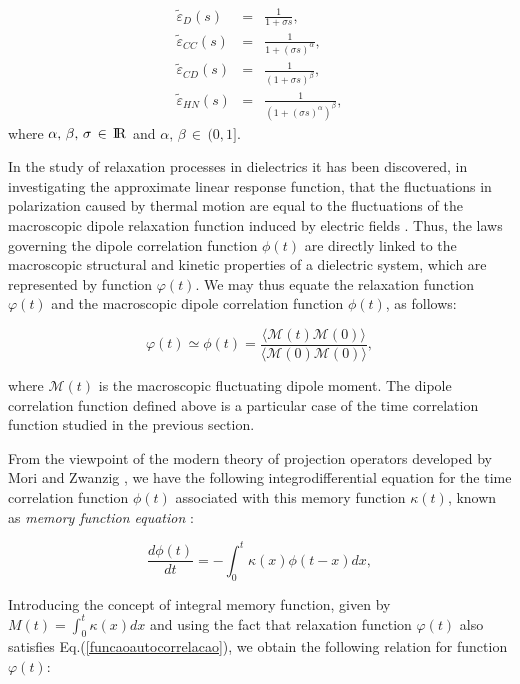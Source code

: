 \documentclass[12pt]{amsart}
\numberwithin{equation}{section}
\newcommand{\real}{{\rm I\!R}}
\begin{document}
\begin{eqnarray}
\tilde{\varepsilon}_{D}(s)&=&\frac{1}{1+\sigma
s},\label{debye}\\
\tilde{\varepsilon}_{CC}(s)&=&\frac{1}{1+(\sigma
s)^\alpha},\label{coco}\\
\tilde{\varepsilon}_{CD}(s)&=&\frac{1}{(1+\sigma
s)^\beta},\label{coda}\\
\tilde{\varepsilon}_{HN}(s)&=&\frac{1}{(1+(\sigma
s)^\alpha)^\beta}\label{hn},
\end{eqnarray}
where $\alpha,\,\beta,\,\sigma\,\in\,\real$ and $\alpha,\,\beta\,\in\,\mbox{(}0,1\mbox{]}$.

In the study of relaxation processes in dielectrics it has been discovered, in
investigating the approximate linear response function, that the fluctuations
in polarization caused by thermal motion are equal to the fluctuations of the
macroscopic dipole relaxation function induced by electric fields
\cite{Williams:1972}. Thus, the laws governing the dipole
correlation function $\phi(t)$ are directly linked to the macroscopic
structural and kinetic properties of a dielectric system, which are represented
by function $\varphi (t)$. We may thus equate the relaxation function
$\varphi(t)$ and the macroscopic dipole correlation function $\phi(t)$, as
follows:
		
\begin{equation}
\varphi(t)\simeq\phi(t)=\frac{\langle
\mathcal{M}(t)\mathcal{M}(0)\rangle}{\langle \mathcal{M}(0)\mathcal{M}(0)\rangle},
\end{equation}
		
where $\mathcal{M}(t)$ is the macroscopic fluctuating dipole moment.
The dipole correlation function defined above is a particular case of the time
correlation function studied in the previous section. 
		
From the viewpoint of the modern theory of projection operators developed
by 
Mori \cite{Mori:1965} and Zwanzig \cite{Zwanzig:1961}, we have the
following integrodifferential equation for the time correlation function 
$\phi(t)$ associated with this memory function $\kappa(t)$,
known as \textit{memory function equation} \cite{Boon:1980}:
		
\begin{equation}
\frac{d\phi(t)}{dt}=-\int_{0}^{t}\kappa(x)\phi(t-x)dx,
\label{funcaoautocorrelacao}
\end{equation}
		
Introducing the concept of integral memory function, given by
$M(t)=\int_0^t \kappa(x)dx$ and using the fact that relaxation function
$\varphi(t)$ also satisfies Eq.(\ref{funcaoautocorrelacao}), we obtain the
following relation for function $\varphi(t)$:
		
\end{document}
